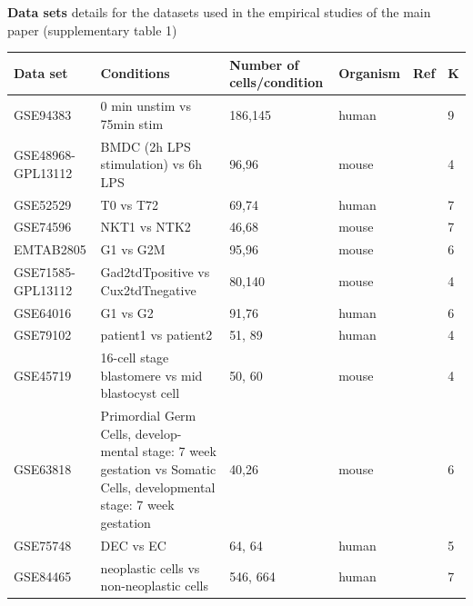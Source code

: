 \documentclass[aoas,preprint]{imsart}
\begin{document}
\noindent
{\bf Data sets} details for the datasets used in the empirical studies of the main paper (supplementary table 1)


\begin{table}[h!]
\small
\centering
\begin{tabular}{ |p{2cm}|p{5cm}|p{2cm}|p{2cm}|p{2cm}|p{1cm}|}
\hline
 Data set & Conditions & Number of cells/condition & Organism  & Ref & K\\ \hline \hline
GSE94383 & 0 min unstim vs 75min stim & 186,145 & human & \citep{Lane} & 9\\ \hline
GSE48968-GPL13112 & BMDC (2h LPS stimulation) vs 6h LPS & 96,96 & mouse & \citep{Shalek} & 4\\ \hline
GSE52529 & T0 vs T72 & 69,74 & human & \citep{Trapnell} & 7\\ \hline
GSE74596 & NKT1 vs NTK2 & 46,68 & mouse & \citep{Engel} & 7\\ \hline
EMTAB2805 & G1 vs G2M & 95,96 & mouse & \citep{EMTAB} & 6\\ \hline
GSE71585-GPL13112 &Gad2tdTpositive vs Cux2tdTnegative  & 80,140 & mouse & \citep{Tasic} & 4\\ \hline
GSE64016 & G1 vs G2 & 91,76 & human & \citep{oscope} & 6\\ \hline
GSE79102 & patient1 vs patient2 & 51, 89 & human & \cite{sc3} & 4\\ \hline
GSE45719 & 16-cell stage blastomere vs mid blastocyst cell & 50, 60 & mouse & \citep{Deng193} & 4\\ \hline
GSE63818 & Primordial Germ Cells, develop- mental stage: 7 week gestation vs Somatic Cells, developmental stage: 7 week gestation & 40,26 & mouse & \citep{Guo} & 6\\ \hline
GSE75748 & DEC vs EC & 64, 64 & human & \citep{chu} & 5\\ \hline
GSE84465 & neoplastic cells vs non-neoplastic cells & 546, 664 & human & \citep{Darmanis} & 7\\ \hline
\end{tabular}
\end{table}
\end{document}
